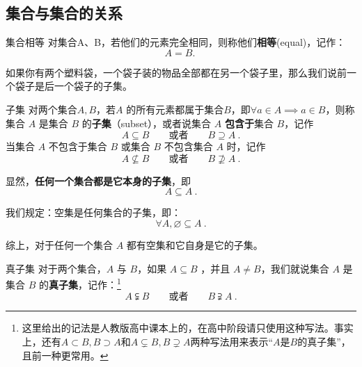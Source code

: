 \subsection{集合与集合的关系}

\begin{definition}{集合相等}
对集合A、B，若他们的元素完全相同，则称他们\textbf{相等}(equal)，记作：
\begin{equation}
A=B.~
\end{equation}
\end{definition}

如果你有两个塑料袋，一个袋子装的物品全部都在另一个袋子里，那么我们说前一个袋子是后一个袋子的子集。

\begin{definition}{子集}
对两个集合$A,B$，若$A$ 的所有元素都属于集合$B$，即$\forall a\in A\implies a\in B$，则称集合 $A$ 是集合 $B$ 的\textbf{子集}（subset），或者说集合 $A$ \textbf{包含于}集合 $B$，记作
\begin{equation}
A \subseteq B\qquad\text{或者}\qquad B \supseteq A~.
\end{equation}
当集合 $A$ 不包含于集合 $B$ 或集合 $B$ 不包含集合 $A$ 时，记作
\begin{equation}
A \nsubseteq B\qquad\text{或者}\qquad B \nsupseteq A~.
\end{equation}
\end{definition}

显然，\textbf{任何一个集合都是它本身的子集}，即
\begin{equation}
A \subseteq A~.
\end{equation}

我们规定：空集是任何集合的子集，即：
\begin{equation}
\forall A,\varnothing \subseteq A~.
\end{equation}

综上，对于任何一个集合 $A$ 都有空集和它自身是它的子集。

\begin{definition}{真子集}
对于两个集合，$A$ 与 $B$，如果 $A\subseteq B$ ，并且 $A \ne B$，我们就说集合 $A$ 是集合 $B$ 的\textbf{真子集}，记作：\footnote{这里给出的记法是人教版高中课本上的，在高中阶段请只使用这种写法。事实上，还有$A\subset B,B\supset A$和$A\subsetneq B,B\supsetneq A$两种写法用来表示“$A$是$B$的真子集”，且前一种更常用。}
\begin{equation}
A \subsetneqq B\qquad\text{或者}\qquad B \supsetneqq A~.
\end{equation}
\end{definition}

